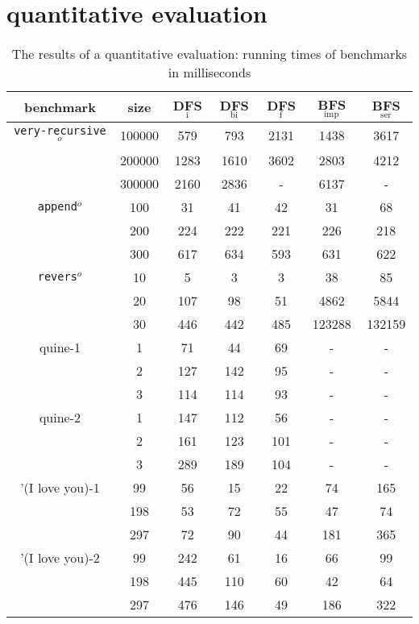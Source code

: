 \documentclass[format=acmlarge, review=true, authordraft=true]{acmart}
\newcommand{\veryrecursiveo}{\texttt{very-recursive$^o$}}
\newcommand{\appendo}{\texttt{append$^o$}}
\newcommand{\reverso}{\texttt{revers$^o$}}
\newcommand{\DFSi }[0]{DFS$_\textrm{i}$}
\newcommand{\DFSf }[0]{DFS$_\textrm{f}$}
\newcommand{\DFSbi}[0]{DFS$_\textrm{bi}$}
\newcommand{\BFSser}[0]{BFS$_\textrm{ser}$}
\newcommand{\BFSimp}[0]{BFS$_\textrm{imp}$}
\begin{document}
\section{quantitative evaluation}

\begin{table}
	\begin{tabular}{|c|c|c|c|c|c|c|}
		\hline 
		benchmark & size & \DFSi{} & \DFSbi{} & \DFSf{} & 
		\BFSimp{} & \BFSser{}  
		\\
		\hline
		\veryrecursiveo & 100000 &  579 &  793 & 2131 & 1438 & 3617 \\
		& 200000 & 1283 & 1610 & 3602 & 2803 & 4212 \\
		& 300000 & 2160 & 2836 &    - & 6137 &    - \\
		\hline 
		\appendo  & 100 &  31 &  41 &  42 &  31 &  68 \\ 
		& 200 & 224 & 222 & 221 & 226 & 218 \\ 
		& 300 & 617 & 634 & 593 & 631 & 622 \\ 
		\hline 
		\reverso & 10 &   5 &   3 &   3 &     38 &     85 \\ 
		& 20 & 107 &  98 &  51 &   4862 &   5844 \\
		& 30 & 446 & 442 & 485 & 123288 & 132159 \\ 
		\hline
		quine-1 & 1 &  71 &  44 & 69 & - & - \\ 
		& 2 & 127 & 142 & 95 & - & - \\ 
		& 3 & 114 & 114 & 93 & - & - \\ 
		\hline
		quine-2 & 1 & 147 & 112 &  56 & - & - \\ 
		& 2 & 161 & 123 & 101 & - & - \\ 
		& 3 & 289 & 189 & 104 & - & - \\ 
		\hline 
		'(I love you)-1 &  99 & 56 & 15 & 22 &  74 & 165 \\ 
		& 198 & 53 & 72 & 55 &  47 &  74 \\
		& 297 & 72 & 90 & 44 & 181 & 365 \\ 
		\hline
		'(I love you)-2 &  99 & 242 &  61 & 16 &  66 &  99 \\ 
		& 198 & 445 & 110 & 60 &  42 &  64 \\
		& 297 & 476 & 146 & 49 & 186 & 322 \\ 
		\hline 
	\end{tabular}
	\caption{The results of a quantitative evaluation: running times of 
	benchmarks 
		in milliseconds}
	\label{compare-efficiency}
\end{table}
\end{document}
